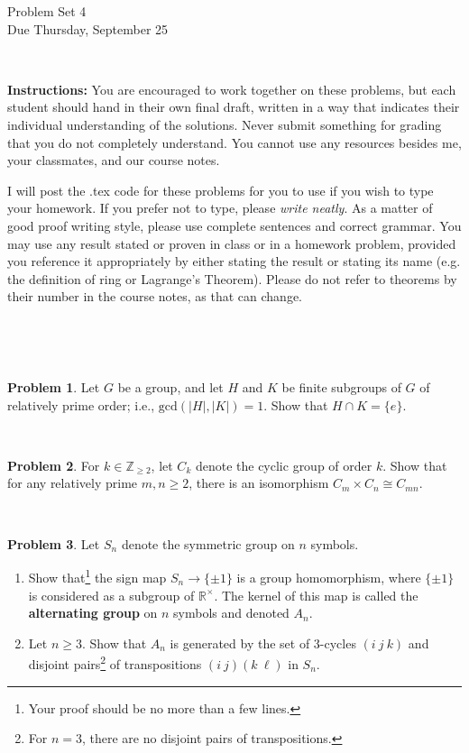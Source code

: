 \documentclass[11pt]{article}
\title{}
\date{\vspace{-0.5in}}
\theoremstyle{definition}
\newtheorem{problem}{Problem}
\begin{document}
\thispagestyle{fancy}
\pagestyle{fancy}

\vspace{3em}

\begin{center}
	{\LARGE Problem Set 4 \\}
	Due Thursday, September 25
\end{center}

\

\noindent
{\bf Instructions:}
You are encouraged to work together on these problems, but each student should hand in their own final draft, written in a way that indicates their individual understanding of the solutions. Never submit something for grading that you do not completely understand. You cannot use any resources besides me, your classmates, and our course notes.


I will post the .tex code for these problems for you to use if you wish to type your homework. If you prefer not to type, please  {\em write neatly}. As a matter of good proof writing style, please use complete sentences and correct grammar. You may use any result stated or proven in class or in a homework problem, provided you reference it appropriately by either stating the result or stating its name (e.g. the definition of ring or Lagrange's Theorem). Please do not refer to theorems by their number in the course notes, as that can change.


\




\

\begin{problem} 
Let $G$ be a group, and let $H$ and $K$ be finite subgroups of $G$ of relatively prime order; i.e., $\mathrm{gcd}(|H|, |K|) = 1$. Show that $H \cap K = \{e\}$.
\end{problem} 

\


\begin{problem} 
For $k\in \mathbb{Z}_{\geq 2}$, let $C_k$ denote the cyclic group of order $k$. Show that for any relatively prime $m,n\geq 2$, there is an isomorphism $C_m \times C_n \cong C_{mn}$.
\end{problem} 

\


\begin{problem} 
Let $S_n$ denote the symmetric group on $n$ symbols.
\begin{enumerate}[(3.1)]
\item Show that\footnote{Your proof should be no more than a few lines.} the sign map $S_n \to \{\pm 1\}$ is a group homomorphism, where $\{\pm 1\}$ is considered as a subgroup of $\mathbb{R}^\times$. The kernel of this map is called the \textbf{alternating group} on $n$ symbols and denoted $A_n$.
\item Let $n\geq 3$. Show that $A_n$ is generated by the set of $3$-cycles $(i \ j\ k)$ and disjoint pairs\footnote{For $n=3$, there are no disjoint pairs of transpositions.} of transpositions $(i \ j) (k \ \ell)$ in $S_n$. 
\end{enumerate}
\end{problem} 
\end{document}

